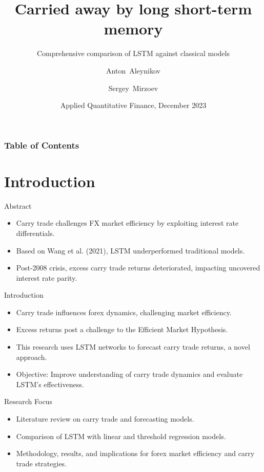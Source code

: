 \documentclass{beamer}
\title[LSTM vs Econometrics] %
{Carried away by long short-term memory}
\subtitle{Comprehensive comparison of LSTM against classical models}
\author[A.~Aleynikov \and S.~Mirzoev] %
{Anton~Aleynikov \and Sergey~Mirzoev}
\institute[ETH] %
{
  MSc Quantitative Finance\\
  ETH Zürich \& University of Zürich
}
\date[AQF 2023] %
{Applied Quantitative Finance, December 2023}
\begin{document}
\frame{\titlepage}


\begin{frame}
\frametitle{Table of Contents}
\tableofcontents
\end{frame}

\section{Introduction}

\begin{frame}{Abstract}
    \begin{itemize}
        \item Carry trade challenges FX market efficiency by exploiting interest rate differentials.
        \item Based on Wang et al. (2021), LSTM underperformed traditional models.
        \item Post-2008 crisis, excess carry trade returns deteriorated, impacting uncovered interest rate parity.
    \end{itemize}
\end{frame}

\begin{frame}{Introduction}
    \begin{itemize}
        \item Carry trade influences forex dynamics, challenging market efficiency.
        \item Excess returns post a challenge to the Efficient Market Hypothesis.
        \item This research uses LSTM networks to forecast carry trade returns, a novel approach.
        \item Objective: Improve understanding of carry trade dynamics and evaluate LSTM's effectiveness.
    \end{itemize}
\end{frame}

\begin{frame}{Research Focus}
    \begin{itemize}
        \item Literature review on carry trade and forecasting models.
        \item Comparison of LSTM with linear and threshold regression models.
        \item Methodology, results, and implications for forex market efficiency and carry trade strategies.
    \end{itemize}
\end{frame}
\end{document}
